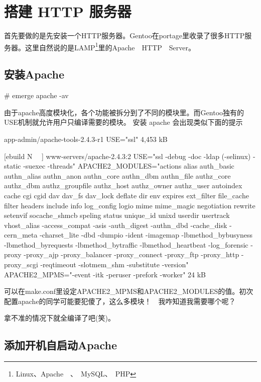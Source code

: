 

\section{搭建 HTTP 服务器}

首先要做的是先安装一个HTTP服务器。Gentoo在portage里收录了很多HTTP服务器。这里自然说的是LAMP\footnote{Linux、Apache　、　MySQL、　PHP}里的Apache　HTTP　Server。

\subsection{安装Apache}

\begin{code}
\# emerge apache -av
\end{code}

由于apache高度模块化，各个功能被拆分到了不同的模块里。而Gentoo独有的USE机制就允许用户只编译需要的模块。
安装 apache 会出现类似下面的提示
\begin{code}
[ebuild  N     ] app-admin/apache-tools-2.4.3-r1  USE="ssl" 4,453 kB

[ebuild  N    　] www-servers/apache-2.4.3:2  USE="ssl -debug -doc -ldap (-selinux) -static -suexec -threads" APACHE2\_MODULES="actions alias auth\_basic authn\_alias authn\_anon authn\_core authn\_dbm authn\_file authz\_core authz\_dbm authz\_groupfile authz\_host authz\_owner authz\_user autoindex cache cgi cgid dav dav\_fs dav\_lock deflate dir env expires ext\_filter file\_cache filter headers include info log\_config logio mime mime\_magic negotiation rewrite setenvif socache\_shmcb speling status unique\_id unixd userdir usertrack vhost\_alias -access\_compat -asis -auth\_digest -authn\_dbd -cache\_disk -cern\_meta -charset\_lite -dbd -dumpio -ident -imagemap -lbmethod\_bybusyness -lbmethod\_byrequests -lbmethod\_bytraffic -lbmethod\_heartbeat -log\_forensic -proxy -proxy\_ajp -proxy\_balancer -proxy\_connect -proxy\_ftp -proxy\_http -proxy\_scgi -reqtimeout -slotmem\_shm -substitute -version" APACHE2\_MPMS="-event -itk -peruser -prefork -worker" 24 kB
\end{code}

可以在make.conf里设定APACHE2\_MPMS和APACHE2\_MODULES的值。初次配置apache的同学可能要犯傻了，这么多模块！　我咋知道我需要哪个呢？

拿不准的情况下就全编译了吧(笑)。

\subsection{添加开机自启动Apache}

